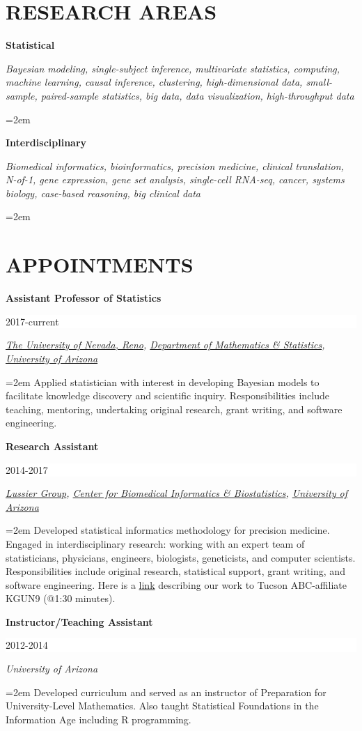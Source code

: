 \documentclass[paper=a4,fontsize=11pt]{scrartcl} %
\newcommand{\sepspace}{\vspace*{1em}}		%
\newcommand{\NewPart}[2]{\section*{\uppercase{#1} #2 }}
\newcommand{\EducationEntry}[4]{
		\noindent \textbf{#1} \hfill      %
		\colorbox{White}{%
			\parbox{6em}{%
			\hfill\color{Black}#2}} \par  %
		\noindent \textit{#3} \par        %
		\noindent\hangindent=2em\hangafter=0 \small #4 %
		\normalsize \par \vspace{-7pt}}
\begin{document}
\NewPart{Research areas}{}
\vspace{-7pt}

\EducationEntry{Statistical}{}{Bayesian modeling, single-subject inference, multivariate statistics, computing, machine learning, causal inference, clustering, high-dimensional data, small-sample, paired-sample statistics, big data, data visualization, high-throughput data}{}

\EducationEntry{Interdisciplinary}{}{Biomedical informatics, bioinformatics, precision medicine, clinical translation, N-of-1, gene expression, gene set analysis, single-cell RNA-seq, cancer, systems biology, case-based reasoning, big clinical data}{}

\NewPart{Appointments}{}
\vspace{-7pt}

\EducationEntry{Assistant Professor of Statistics}{2017-current}{{\href{https://www.unr.edu/}{The University of Nevada, Reno}}, {\href{https://www.unr.edu/math/}{Department of Mathematics \& Statistics}}, {\href{http://www.arizona.edu/}{University of Arizona}}}{Applied statistician with interest in developing Bayesian models to facilitate knowledge discovery and scientific inquiry. Responsibilities include teaching, mentoring, undertaking original research, grant writing, and software engineering.}
\sepspace

\EducationEntry{Research Assistant}{2014-2017}{{\href{http://lussierlab.org/}{Lussier Group}}, {\href{http://cb2.uahs.arizona.edu/}{Center for Biomedical Informatics \& Biostatistics}}, {\href{http://www.arizona.edu/}{University of Arizona}}}{Developed statistical informatics methodology for precision medicine. Engaged in interdisciplinary research: working with an expert team of statisticians, physicians, engineers, biologists, geneticists, and computer scientists. Responsibilities include original research, statistical support, grant writing, and software engineering. Here is a \href{http://cb2.uahs.arizona.edu/news/dr-lussier-and-grant-schissler-speak-big-data-kgun9-local-news}{link} describing our work to Tucson ABC-affiliate KGUN9 (@1:30 minutes).}
\sepspace

\EducationEntry{Instructor/Teaching Assistant}{2012-2014}{University of Arizona}
{Developed curriculum and served as an instructor of Preparation for University-Level Mathematics. Also taught Statistical Foundations in the Information Age including \textsc{R} programming.}
\sepspace
\end{document}
